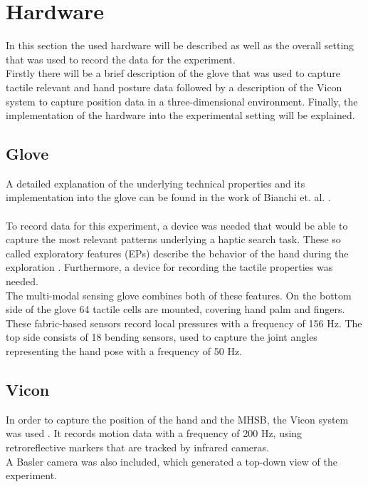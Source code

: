 \section{Hardware} \label{Hardware}
In this section the used hardware will be described as well as the overall setting that was used to record the data for the experiment.\\
Firstly there will be a brief description of the glove that was used to capture tactile relevant and hand posture data followed by a description of the Vicon system to capture position data in a three-dimensional environment. Finally, the implementation of the hardware into the experimental setting will be explained.

\subsection{Glove}
A detailed explanation of the underlying technical properties and its implementation into the glove can be found in the work of Bianchi et. al. \cite{Glove}.\\
\\
To record data for this experiment, a device was needed that would be able to capture the most relevant patterns underlying a haptic search task. These so called exploratory features (EPs) describe the behavior of the hand during the exploration \cite{EPs}. Furthermore, a device for recording the tactile properties was needed.\\
The multi-modal sensing glove combines both of these features. On the bottom side of the glove 64 tactile cells are mounted, covering hand palm and fingers. These fabric-based sensors record local pressures with a frequency of 156 Hz. The top side consists of 18 bending sensors, used to capture the joint angles representing the hand pose with a frequency of 50 Hz.
 
\subsection{Vicon}
In order to capture the position of the hand and the MHSB, the Vicon system was used \cite{Vicon}. It records motion data with a frequency of 200 Hz, using retroreflective markers that are tracked by infrared cameras.\\
A Basler camera was also included, which generated a top-down view of the experiment. 

